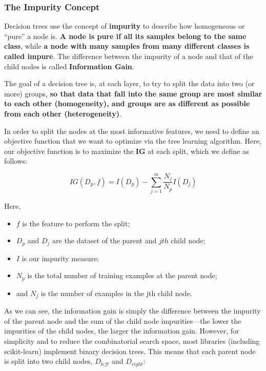 \documentclass[11pt]{article}
\providecommand{\tightlist}{%
      \setlength{\itemsep}{0pt}\setlength{\parskip}{0pt}}
\begin{document}
    \hypertarget{the-impurity-concept}{%
\subsubsection{The Impurity Concept}\label{the-impurity-concept}}

Decision trees use the concept of \textbf{impurity} to describe how
homogeneous or ``pure'' a node is. \textbf{A node is pure if all its
samples belong to the same class}, while \textbf{a node with many
samples from many different classes is called impure}. The difference
between the impurity of a node and that of the child nodes is called
\textbf{Information Gain}.

The goal of a decision tree is, at each layer, to try to split the data
into two (or more) groups, \textbf{so that data that fall into the same
group are most similar to each other (homogeneity), and groups are as
different as possible from each other (heterogeneity)}.

    In order to split the nodes at the most informative features, we need to
define an objective function that we want to optimize via the tree
learning algorithm. Here, our objective function is to maximize the
\textbf{IG} at each split, which we define as follows:

\begin{equation}
IG(D_p, f) = I(D_p) - \sum\limits_{j=1}^m \frac{N_j}{N_p} I(D_j)
\end{equation}

Here,

\begin{itemize}
\tightlist
\item
  \(f\) is the feature to perform the split;
\item
  \(𝐷_𝑝\) and \(𝐷_𝑗\) are the dataset of the parent and \(jth\) child
  node;
\item
  \(I\) is our impurity measure;
\item
  \(𝑁_𝑝\) is the total number of training examples at the parent node;
\item
  and \(𝑁_𝑗\) is the number of examples in the jth child node.
\end{itemize}

As we can see, the information gain is simply the difference between the
impurity of the parent node and the sum of the child node
impurities---the lower the impurities of the child nodes, the larger the
information gain. However, for simplicity and to reduce the
combinatorial search space, most libraries (including scikit-learn)
implement binary decision trees. This means that each parent node is
split into two child nodes, \(D_{left}\) and \(D_{right}\):
\end{document}
